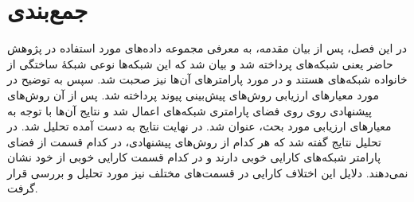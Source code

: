 \section{جمع‌بندی}
در این فصل، پس از بیان مقدمه، به معرفی مجموعه داده‌های مورد استفاده در پژوهش حاضر یعنی شبکه‌های  پرداخته شد و بیان شد که این شبکه‌ها نوعی شبکهٔ ساختگی از خانواده شبکه‌های \ScaleFree هستند و در مورد پارامترهای آن‌ها نیز صحبت شد. سپس به توضیح در مورد معیارهای ارزیابی روش‌های پیش‌بینی پیوند پرداخته شد. پس از آن روش‌های پیشنهادی روی روی فضای پارامتری شبکه‌های  اعمال شد و نتایج آن‌ها با توجه به معیارهای ارزیابی مورد بحث، عنوان شد. در نهایت نتایج به دست آمده تحلیل شد. در تحلیل نتایج گفته شد که هر کدام از روش‌های پیشنهادی، در کدام قسمت از فضای پارامتر شبکه‌های  کارایی خوبی دارند و در کدام قسمت کارایی خوبی از خود نشان نمی‌دهند. دلایل این اختلاف کارایی در قسمت‌های مختلف نیز مورد تحلیل و بررسی قرار گرفت.
